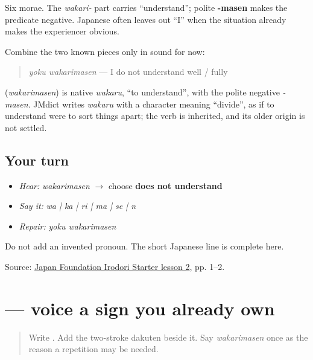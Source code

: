 Six morae. The \emph{wakari-} part carries “understand”; polite \textbf{-masen} makes the predicate negative. Japanese often leaves out “I” when the situation already makes the experiencer obvious.

Combine the two known pieces only in sound for now:

\begin{quote}
\emph{yoku wakarimasen} — I do not understand well / fully
\end{quote}

\begin{cousinweb}
\textbf{} (\emph{wakarimasen}) is native \emph{wakaru}, \textquotedblleft{}to understand\textquotedblright{}, with the polite negative \emph{-masen}. JMdict writes \emph{wakaru} with a character meaning \textquotedblleft{}divide\textquotedblright{}, as if to understand were to sort things apart; the verb is inherited, and its older origin is not settled.
\end{cousinweb}

\subsection*{Your turn}
\begin{itemize}
\raggedright
  \item \emph{Hear:} \emph{wakarimasen} $\to$ choose \textbf{does not understand}
  \item \emph{Say it:} \emph{wa | ka | ri | ma | se | n}
  \item \emph{Repair:} \emph{yoku wakarimasen}
\end{itemize}

\begin{tcolorbox}[breakable,colback=teal!4,colframe=teal!35!black,title={Before you move on}]
Do not add an invented pronoun. The short Japanese line is complete here.

Source: \href{https://www.irodori.jpf.go.jp/assets/data/starter/pdf/X\_L02.pdf}{Japan Foundation Irodori Starter lesson 2}, pp. 1–2.
\end{tcolorbox}
\section[\texorpdfstring{\ja{ど} (do)}{ど (do)}]{ — voice a sign you already own}

\label{lesson:JA-W09-do}



\begin{quote}
Write \textbf{}. Add the two-stroke dakuten beside it. Say \emph{wakarimasen} once as the reason a repetition may be needed.
\end{quote}


